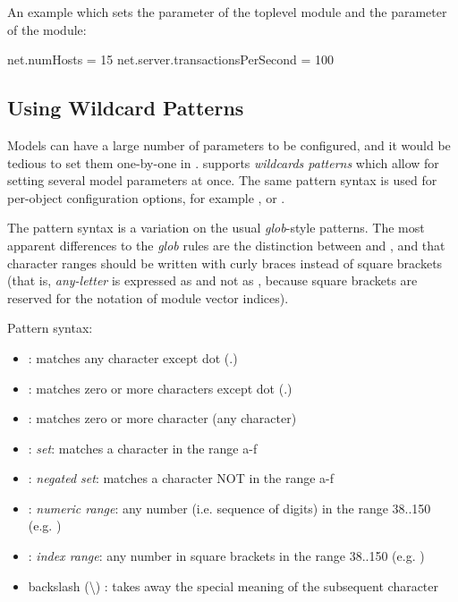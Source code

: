 An example  which sets the  parameter of
the toplevel module and the  parameter of the
 module:

\begin{inifile}
[General]
net.numHosts = 15
net.server.transactionsPerSecond = 100
\end{inifile}


\subsection{Using Wildcard Patterns}
\label{sec:ch-config-sim:wildcards}

Models can have a large number of parameters to be configured, and it would
be tedious to set them one-by-one in . {\opp} supports
\textit{wildcards patterns} which allow for setting several model parameters
at once. The same pattern syntax is used for per-object configuration options,
for example , or .

The pattern syntax is a variation on the usual \textit{glob}-style
patterns. The most apparent differences to the \textit{glob} rules are the
distinction between \ttt{*} and \ttt{**}, and that character ranges should
be written with curly braces instead of square brackets (that is,
\textit{any-letter} is expressed as  and not as
\ttt{[a-zA-Z]}, because square brackets are reserved for the notation of
module vector indices).

Pattern syntax:

\begin{itemize}
  \item {} : matches any character except dot (.)
  \item \ttt{*} : matches zero or more characters except dot (.)
  \item \ttt{**} : matches zero or more character (any character)
  \item {} : \textit{set}: matches a character in the range a-f
  \item {}: \textit{negated set}: matches a character
    NOT in the range a-f
  \item {} : \textit{numeric range}: any number (i.e. sequence of digits)
    in the range 38..150  (e.g. )
  \item \ttt{[38..150]} : \textit{index range}: any number in square brackets in the
    range 38..150 (e.g. \ttt{[99]})
  \item backslash ({\textbackslash}) : takes away the special meaning of the
    subsequent character
\end{itemize}

